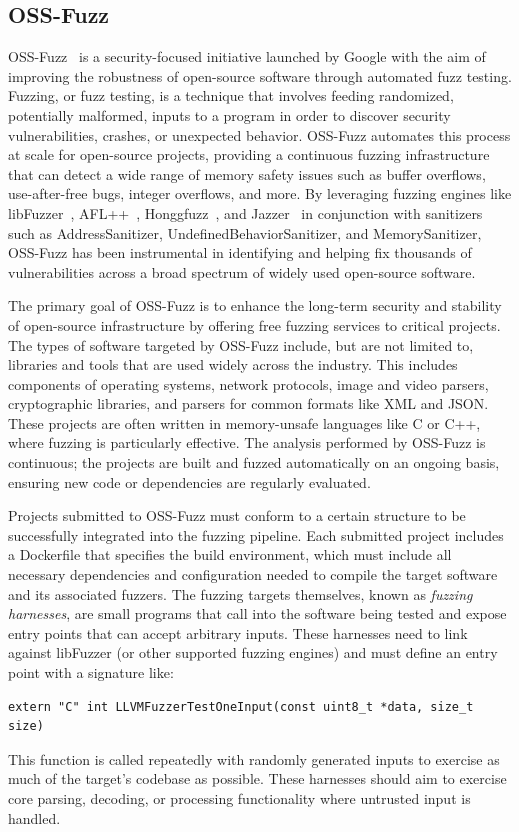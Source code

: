 \subsection{OSS-Fuzz}
\label{sec:bg-ossfuzz}\label{sec:oss-fuzz}
OSS-Fuzz~\cite{oss-fuzz} is a security-focused initiative launched by Google with the aim of improving the robustness of open-source software through automated fuzz testing.
Fuzzing, or fuzz testing, is a technique that involves feeding randomized, potentially malformed, inputs to a program in order to discover security vulnerabilities, crashes, or unexpected behavior.
OSS-Fuzz automates this process at scale for open-source projects, providing a continuous fuzzing infrastructure that can detect a wide range of memory safety issues such as buffer overflows, use-after-free bugs, integer overflows, and more.
By leveraging fuzzing engines like libFuzzer~\cite{libfuzzer}, AFL++~\cite{aflplusplus}, Honggfuzz~\cite{honggfuzz}, and Jazzer~\cite{jazzer} in conjunction with sanitizers such as AddressSanitizer, UndefinedBehaviorSanitizer, and MemorySanitizer, OSS-Fuzz has been instrumental in identifying and helping fix thousands of vulnerabilities across a broad spectrum of widely used open-source software.

The primary goal of OSS-Fuzz is to enhance the long-term security and stability of open-source infrastructure by offering free fuzzing services to critical projects.
The types of software targeted by OSS-Fuzz include, but are not limited to, libraries and tools that are used widely across the industry.
This includes components of operating systems, network protocols, image and video parsers, cryptographic libraries, and parsers for common formats like XML and JSON.
These projects are often written in memory-unsafe languages like C or C++, where fuzzing is particularly effective.
The analysis performed by OSS-Fuzz is continuous; the projects are built and fuzzed automatically on an ongoing basis, ensuring new code or dependencies are regularly evaluated.

Projects submitted to OSS-Fuzz must conform to a certain structure to be successfully integrated into the fuzzing pipeline.
Each submitted project includes a Dockerfile that specifies the build environment, which must include all necessary dependencies and configuration needed to compile the target software and its associated fuzzers.
The fuzzing targets themselves, known as \emph{fuzzing harnesses}, are small programs that call into the software being tested and expose entry points that can accept arbitrary inputs.
These harnesses need to link against libFuzzer (or other supported fuzzing engines) and must define an entry point with a signature like:
\begin{verbatim}
extern "C" int LLVMFuzzerTestOneInput(const uint8_t *data, size_t size)
\end{verbatim}
This function is called repeatedly with randomly generated inputs to exercise as much of the target's codebase as possible.
These harnesses should aim to exercise core parsing, decoding, or processing functionality where untrusted input is handled.


